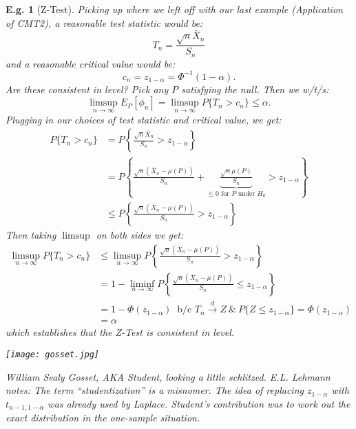 \documentclass{tufte-book}
\theoremstyle{mytheoremstyle}
\theoremstyle{mylemstyle}
\theoremstyle{mydefstyle}
\newtheorem*{ex}{E.g.}
\begin{document}
\begin{ex}[Z-Test] Picking up where we left off with our last example (Application of CMT2), a reasonable test statistic would be:
	\[T_n = \frac{\sqrt{n}\bar{X}_n}{S_n}\]
and a reasonable critical value would be:
	\[c_n = z_{1-\alpha} = \Phi^{-1}(1-\alpha) \text{.}\]
Are these consistent in level? Pick any \(P\) satisfying the null. Then we w/t/s:
	\[\limsup_{n \rightarrow \infty} E_P[\phi_n] = \limsup_{n \rightarrow \infty} P\{T_n > c_n\} \le \alpha \text{.}\]
Plugging in our choices of test statistic and critical value, we get:
	\begin{align*}
		P\{T_n > c_n\} & = P\left\{\frac{\sqrt{n}\bar{X}_n}{S_n} > z_{1-\alpha}\right\} \\
					& = P\left\{\frac{\sqrt{n}(\bar{X}_n - \mu(P))}{S_n} + \underbrace{\frac{\sqrt{n}\mu(P)}{S_n}}_\textrm{\(\le 0\) for \(P\) under \(H_0\)} > z_{1-\alpha}\right\} \\
					& \le P\left\{\frac{\sqrt{n}(\bar{X}_n - \mu(P))}{S_n} > z_{1-\alpha}\right\}
	\end{align*}
Then taking \(\limsup\) on both sides we get:
	\begin{align*}
		\limsup_{n\rightarrow \infty} P\{T_n > c_n\} & \le \limsup_{n\rightarrow \infty} P\left\{\frac{\sqrt{n}(\bar{X}_n - \mu(P))}{S_n} > z_{1-\alpha}\right\} \\
										& = 1- \liminf_{n \rightarrow \infty} P\left\{\frac{\sqrt{n}(\bar{X}_n - \mu(P))}{S_n} \le z_{1-\alpha}\right\} \\
										& = 1 - \Phi(z_{1-\alpha})\ \text{ b/c \(T_n \overset{d}{\rightarrow} Z\ \&\ P\{Z \le z_{1-\alpha}\} = \Phi(z_{1-\alpha})\)} \\
										& = \alpha
	\end{align*}
which establishes that the Z-Test is consistent in level.\begin{marginfigure}[-2in] \texttt{[image: gosset.jpg]} \caption{William Sealy Gosset, AKA Student, looking a little schlitzed. E.L. Lehmann notes: The term ``studentization'' is a misnomer. The idea of replacing \(z_{1-\alpha}\) with \(t_{n-1, 1-\alpha}\) was already used by Laplace. Student's contribution was to work out the \emph{exact} distribution in the one-sample situation.} \end{marginfigure}
\end{ex}
\end{document}
